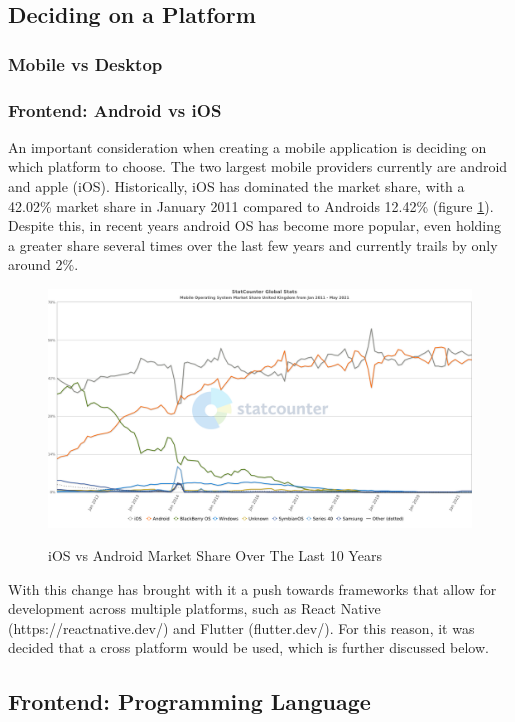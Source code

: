 \documentclass[12pt]{article}
\begin{document}
	\subsection{Deciding on a Platform}
	\subsubsection{Mobile vs Desktop}
	
	\subsubsection{Frontend: Android vs iOS}
	An important consideration when creating a mobile application is deciding on which platform to choose. The two largest mobile providers currently are android and apple (iOS). Historically, iOS has dominated the market share, with a 42.02\% market share in January 2011 compared to Androids 12.42\% (figure \ref{fig:ios-android}). Despite this, in recent years android OS has become more popular, even holding a greater share several times over the last few years and currently trails by only around 2\%.
	
	\begin{figure}[H]
		\centering
		\includegraphics[scale=0.4]{images/ios-android.png}
		\caption{iOS vs Android Market Share Over The Last 10 Years}
		\label{fig:ios-android}
		\cite{stat-counter-21}
	\end{figure}
	
	With this change has brought with it a push towards frameworks that allow for development across multiple platforms, such as React Native (https://reactnative.dev/) and Flutter (flutter.dev/). For this reason, it was decided that a cross platform would be used, which is further discussed below.
	
	\subsection{Frontend: Programming Language}
	
\end{document}
